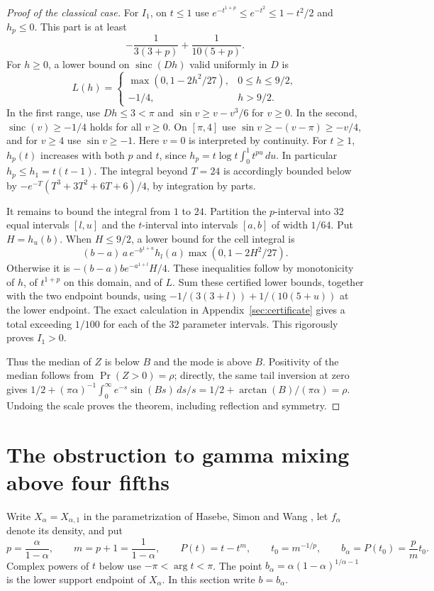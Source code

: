 \documentclass[11pt,a4paper]{article}
\numberwithin{equation}{section}
\begin{document}
\begin{proof}[Proof of the classical case]
For $I_1$, on $t\le1$ use $e^{-t^{1+p}}\le e^{-t^2}\le 1-t^2/2$ and $h_p\le0$. This part is at least
\[
 -\frac1{3(3+p)}+\frac1{10(5+p)}.
\]
For $h\ge0$, a lower bound on $\operatorname{sinc}(Dh)$ valid uniformly in $D$ is
\[
 L(h)=\begin{cases}
 \max(0,1-2h^2/27),&0\le h\le9/2,\\
 -1/4,&h>9/2 .
 \end{cases}
\]
In the first range, use $Dh\le3<\pi$ and $\sin v\ge v-v^3/6$ for $v\ge0$. In the second, $\operatorname{sinc}(v)\ge-1/4$ holds for all $v\ge0$. On $[\pi,4]$ use $\sin v\ge-(v-\pi)\ge-v/4$, and for $v\ge4$ use $\sin v\ge-1$. Here $v=0$ is interpreted by continuity. For $t\ge1$, $h_p(t)$ increases with both $p$ and $t$, since $h_p=t\log t\int_0^1 t^{pu}\,du$. In particular $h_p\le h_1=t(t-1)$. The integral beyond $T=24$ is accordingly bounded below by
$-e^{-T}(T^3+3T^2+6T+6)/4$, by integration by parts.

It remains to bound the integral from $1$ to $24$. Partition the $p$-interval into 32 equal intervals $[l,u]$ and the $t$-interval into intervals $[a,b]$ of width $1/64$. Put $H=h_u(b)$. When $H\le9/2$, a lower bound for the cell integral is
\[
 (b-a)\,a\,e^{-b^{1+u}}h_l(a)\max(0,1-2H^2/27).
\]
Otherwise it is $-(b-a)b e^{-a^{1+l}}H/4$. These inequalities follow by monotonicity of $h$, of $t^{1+p}$ on this domain, and of $L$. Sum these certified lower bounds, together with the two endpoint bounds, using $-1/(3(3+l))+1/(10(5+u))$ at the lower endpoint. The exact calculation in Appendix~\ref{sec:certificate} gives a total exceeding $1/100$ for each of the 32 parameter intervals. This rigorously proves $I_1>0$.

Thus the median of $Z$ is below $B$ and the mode is above $B$. Positivity of the median follows from $\Pr(Z>0)=\rho$; directly, the same tail inversion at zero gives $1/2+(\pi\alpha)^{-1}\int_0^\infty e^{-s}\sin(Bs)\,ds/s=1/2+\arctan(B)/(\pi\alpha)=\rho$. Undoing the scale proves the theorem, including reflection and symmetry.
\end{proof}
\section{The obstruction to gamma mixing above four fifths}
\label{sec:mixture-obstruction}

Write $X_\alpha=X_{\alpha,1}$ in the parametrization of
Hasebe, Simon and Wang \cite{HSW}, let $f_\alpha$ denote its density,
and put
\[
 p=\frac{\alpha}{1-\alpha},\qquad m=p+1=\frac{1}{1-\alpha},
 \qquad P(t)=t-t^{m},\qquad t_0=m^{-1/p},\qquad
 b_\alpha=P(t_0)=\frac{p}{m}t_0 .
\]
Complex powers of $t$ below use $-\pi<\arg t<\pi$.
The point $b_\alpha=\alpha(1-\alpha)^{1/\alpha-1}$ is the lower
support endpoint of $X_\alpha$. In this section write $b=b_\alpha$.
\end{document}
